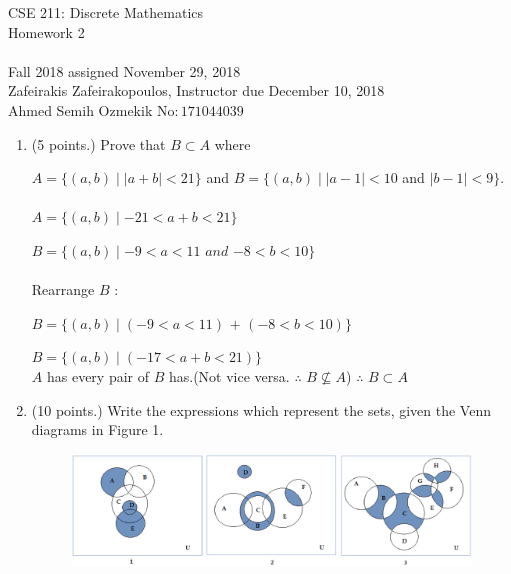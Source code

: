 \documentclass[12pt,fleqn]{article}
\begin{document}

\setcounter{page}{1}
\thispagestyle{empty}

\begin{center}
\LARGE
CSE 211: Discrete Mathematics \\
Homework 2 \\
\normalsize 
\ \\
Fall 2018 \hfill assigned November 29, 2018 \\
Zafeirakis  Zafeirakopoulos, Instructor \hfill due December 10, 2018 \ \\
Ahmed Semih Ozmekik \hfill No$:171044039$

\end{center}

\normalsize

\begin{enumerate}


\item (5 points.) Prove that $B \subset A$ where
 
 $A = \{(a,b) \mid |a+b| < 21\}$ and
 $B = \{(a,b)\mid |a-1|<10 $ and $ |b-1| < 9\}$.
 \\\\
 $A = \{(a,b) \mid -21 < a+b < 21\}$  
 
 $B = \{(a,b)\mid -9 < a <11 $ $and $ $ -8 < b < 10\}$
 \\\\
 Rearrange $B$ :
 
 $B = \{(a,b)\mid (-9 < a <11) $ $+ $ $ (-8 < b < 10)\}$
 
 
 $B = \{(a,b)\mid (-17 < a + b < 21 )\}$\\
 
$A$ has every pair of $B$ has.(Not vice versa. $\therefore$ $ B \nsubseteq A $) $\therefore$ $ B \subset A $
 
 
 \item (10 points.) Write the expressions which represent the sets, given the Venn diagrams in Figure 1. 
 
\begin{figure}[h]
\centering
  \includegraphics[width=150mm]{vennquestion.eps}
  \caption{}
  \label{}
\end{figure}


\end{enumerate}
\end{document}
